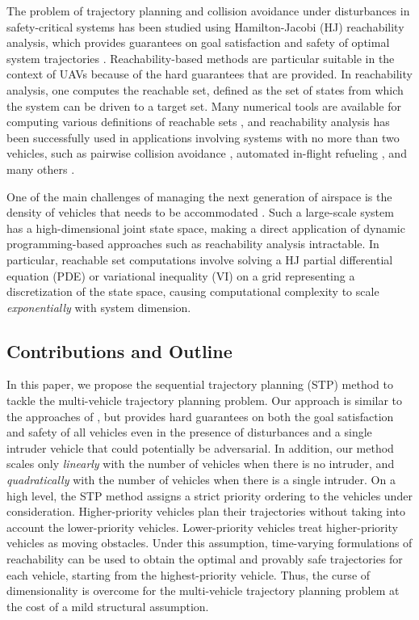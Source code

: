 The problem of trajectory planning and collision avoidance under disturbances in safety-critical systems has been studied using Hamilton-Jacobi (HJ) reachability analysis, which provides guarantees on goal satisfaction and safety of optimal system trajectories \cite{Barron90, Mitchell05, Bokanowski10, Bokanowski11, Margellos11, Fisac15}. Reachability-based methods are particular suitable in the context of UAVs because of the hard guarantees that are provided. In reachability analysis, one computes the reachable set, defined as the set of states from which the system can be driven to a target set. Many numerical tools are available for computing various definitions of reachable sets \cite{Sethian96, Osher02, Mitchell02, Mitchell07b}, and reachability analysis has been successfully used in applications involving systems with no more than two vehicles, such as pairwise collision avoidance \cite{Mitchell05}, automated in-flight refueling \cite{Ding08}, and many others \cite{Huang11, Bayen07}.

One of the main challenges of managing the next generation of airspace is the density of vehicles that needs to be accommodated \cite{Kopardekar16}. Such a large-scale system has a high-dimensional joint state space, making a direct application of dynamic programming-based approaches such as reachability analysis intractable. In particular, reachable set computations involve solving a HJ partial differential equation (PDE) or variational inequality (VI) on a grid representing a discretization of the state space, causing computational complexity to scale \textit{exponentially} with system dimension.

\subsection{Contributions and Outline}
In this paper, we propose the sequential trajectory planning (STP) method to tackle the multi-vehicle trajectory planning problem. 
Our approach is similar to the approaches of \cite{Erdmann1987, VandenBerg2005}, but provides hard guarantees on both the goal satisfaction and safety of all vehicles even in the presence of disturbances and a single intruder vehicle that could potentially be adversarial. 
In addition, our method scales only \textit{linearly} with the number of vehicles when there is no intruder, and \textit{quadratically} with the number of vehicles when there is a single intruder.
On a high level, the STP method assigns a strict priority ordering to the vehicles under consideration. Higher-priority vehicles plan their trajectories without taking into account the lower-priority vehicles. 
Lower-priority vehicles treat higher-priority vehicles as moving obstacles. 
Under this assumption, time-varying formulations of reachability \cite{Bokanowski11, Fisac15} can be used to obtain the optimal and provably safe trajectories for each vehicle, starting from the highest-priority vehicle. 
Thus, the curse of dimensionality is overcome for the multi-vehicle trajectory planning problem at the cost of a mild structural assumption. 

